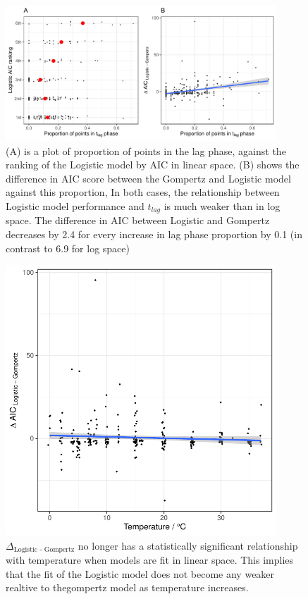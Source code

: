 \documentclass[11pt, a4paper]{article}
\begin{document}
        
                        \begin{figure}[H]
        \includegraphics[width=4in]{../results/tlag_vs_logistic_linear.pdf}
        \centering
        \caption{(A) is a plot of proportion of points in the lag phase, against the ranking of the Logistic model by AIC in linear space. (B) shows the difference in AIC score between the Gompertz and Logistic model against this proportion, In both cases, the relationship between Logistic model performance and $t_{lag}$ is much weaker than in log space. The difference in AIC between Logistic and Gompertz decreases by 2.4 for every increase in lag phase proportion by 0.1 (in contrast to 6.9 for log space)}
        \label{sup:tlag_logistic_linear}
        \end{figure} 
        
                                \begin{figure}[H]
        \includegraphics[width=4in]{../results/logistic_vs_gompertz_temp_linear.pdf}
        \centering
        \caption{$\Delta_{\text{Logistic - Gompertz}}$ no longer has a statistically significant relationship with temperature when models are fit in linear space. This implies that the fit of the Logistic model does not become any weaker realtive to thegompertz model as temperature increases.}
        \label{sup:logistic_temp_linear}
        \end{figure} 
        
\end{document}
